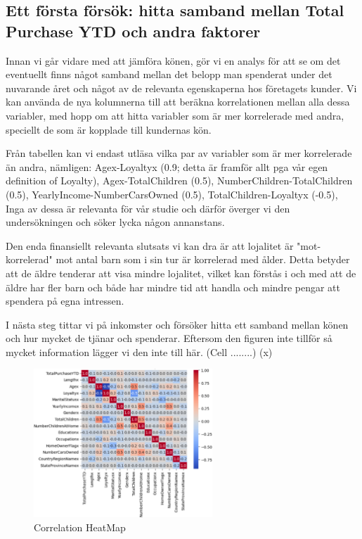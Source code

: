 \documentclass[]{article}
\begin{document}
\subsection{Ett första försök: hitta samband mellan Total Purchase YTD och andra faktorer}

Innan vi går vidare med att jämföra könen, gör vi en analys för att se om det eventuellt finns något samband mellan det belopp man spenderat under det nuvarande året och något av de relevanta egenskaperna hos företagets kunder. Vi kan använda de nya kolumnerna till att beräkna korrelationen mellan alla dessa variabler, med hopp om att hitta variabler som är mer korrelerade med andra, speciellt de som är kopplade till kundernas kön.

Från tabellen kan vi endast utläsa vilka par av variabler som är mer korrelerade än andra, nämligen: Agex-Loyaltyx (0.9; detta är framför allt pga vår egen definition of Loyalty), Agex-TotalChildren (0.5), NumberChildren-TotalChildren (0.5), YearlyIncome-NumberCarsOwned (0.5), TotalChildren-Loyaltyx (-0.5), Inga av dessa är relevanta för vår studie och därför överger vi den undersökningen och söker lycka någon annanstans.

Den enda finansiellt relevanta slutsats vi kan dra är att lojalitet är "mot-korrelerad" mot antal barn som i sin tur är korrelerad med ålder. Detta betyder att de äldre tenderar att visa mindre lojalitet, vilket kan förstås i och med att de äldre har fler barn och både har mindre tid att handla och mindre pengar att spendera på egna intressen.

I nästa steg tittar vi på inkomster och försöker hitta ett samband mellan könen och hur mycket de tjänar och spenderar. Eftersom den figuren inte tillför så mycket information lägger vi den inte till här. (Cell ........)
\if(x)
\begin{figure}[h]
    \centering
    \includegraphics[width=0.6\textwidth]{img_correlation_heatmap.png}
    \caption{Correlation HeatMap}
\end{figure}
\fi
\end{document}
